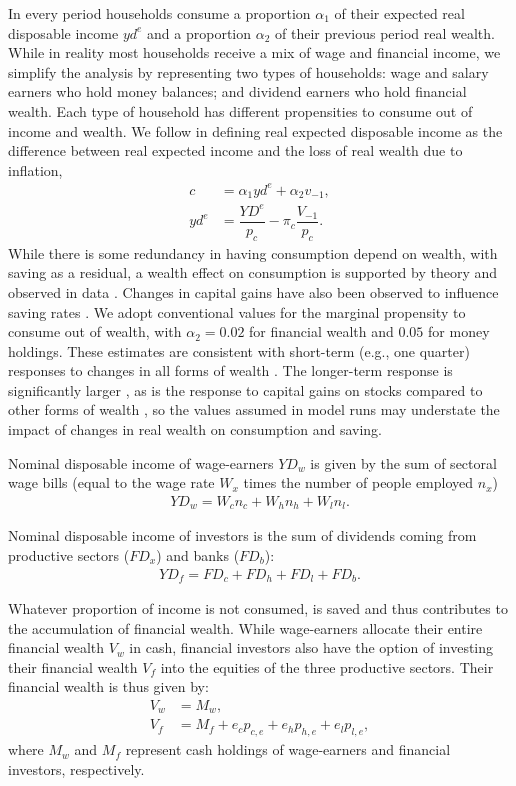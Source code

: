 \documentclass[authoryear]{article}
\begin{document}
In every period households consume a proportion $\alpha_1$ of their expected real disposable income $yd^e$ and a proportion $\alpha_2$ of their previous period real wealth. While in reality most households receive a mix of wage and financial income, we simplify the analysis by representing two types of households: wage and salary earners who hold money balances; and dividend earners who hold financial wealth. Each type of household has different propensities to consume out of income and wealth. We follow \citet{Godley:2007} in defining real expected disposable income as the difference between real expected income and the loss of real wealth due to inflation,
\begin{align}
c&=\alpha_1 yd^e + \alpha_2 v_{-1},\\
yd^e&=\dfrac{YD^e}{p_c}-\pi_c \dfrac{V_{-1}}{p_c}.
\end{align}
While there is some redundancy in having consumption depend on wealth, with saving as a residual, a wealth effect on consumption is supported by theory and observed in data \citet{poterba_stock_2000}. Changes in capital gains have also been observed to influence saving rates \citet{juster_decline_2006}. We adopt conventional values for the marginal propensity to consume out of wealth, with $\alpha_2 = 0.02$ for financial wealth and $0.05$ for money holdings. These estimates are consistent with short-term (e.g., one quarter) responses to changes in all forms of wealth \citet{poterba_stock_2000}. The longer-term response is significantly larger \citet{carroll_how_2011}, as is the response to capital gains on stocks compared to other forms of wealth \citet{juster_decline_2006}, so the values assumed in model runs may understate the impact of changes in real wealth on consumption and saving.

Nominal disposable income of wage-earners $YD_w$ is given by the sum of sectoral wage bills (equal to the wage rate $W_x$ times the number of people employed $n_x$)
\begin{align}
YD_w=W_c n_c+ W_h n_h+W_l n_l.
\end{align}

Nominal disposable income of investors is the sum of dividends coming from productive sectors ($FD_x$) and banks ($FD_b$):
\begin{align}
YD_f=FD_c+FD_h+FD_l+FD_b.
\end{align}

Whatever proportion of income is not consumed, is saved and thus contributes to the accumulation of financial wealth. While wage-earners allocate their entire financial wealth $V_w$ in cash, financial investors also have the option of investing their financial wealth $V_f$ into the equities of the three productive sectors. Their financial wealth is thus given by: 
\begin{align}
V_w&=M_w, \\
V_f&=M_f+e_cp_{c,e}+e_hp_{h,e}+e_lp_{l,e},
\end{align}
where $M_w$ and $M_f$ represent cash holdings of wage-earners and financial investors, respectively.
\end{document}
